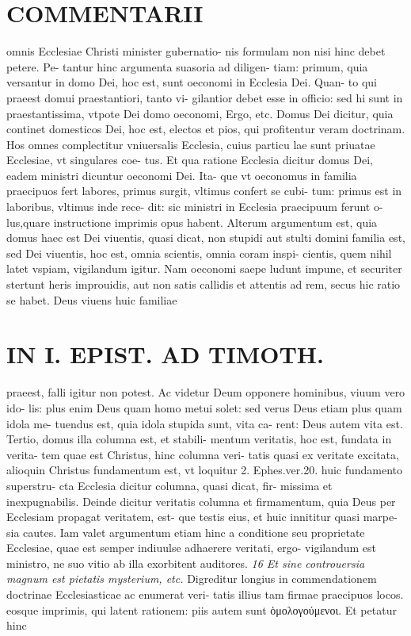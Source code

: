 \documentclass{article}
\begin{document}
\begin{pages}
\section*{COMMENTARII }
\marginpar{[ p.78 ]}\pstart omnis Ecclesiae Christi minister gubernatio- nis formulam non nisi hinc debet petere. Pe- tantur hinc argumenta suasoria ad diligen- tiam: primum, quia versantur in domo Dei, hoc est, sunt oeconomi in Ecclesia Dei. Quan- to qui praeest domui praestantiori, tanto vi- gilantior debet esse in officio: sed hi sunt in praestantissima, vtpote Dei domo oeconomi, Ergo, etc. Domus Dei dicitur, quia continet domesticos Dei, hoc est, electos et pios, qui profitentur veram doctrinam. Hos omnes complectitur vniuersalis Ecclesia, cuius particu lae sunt priuatae Ecclesiae, vt singulares coe- tus. Et qua ratione Ecclesia dicitur domus Dei, eadem ministri dicuntur oeconomi Dei. Ita- que vt oeconomus in familia praecipuos fert labores, primus surgit, vltimus confert se cubi- tum: primus est in laboribus, vltimus inde rece- dit: sic ministri in Ecclesia praecipuum ferunt o- lus,quare instructione imprimis opus habent.  \pend\pstart Alterum argumentum est, quia domus haec est Dei viuentis, quasi dicat, non stupidi aut stulti domini familia est, sed Dei viuentis, hoc est, omnia scientis, omnia coram inspi- cientis, quem nihil latet vspiam, vigilandum igitur. Nam oeconomi saepe ludunt impune, et securiter stertunt heris improuidis, aut non satis callidis et attentis ad rem, secus hic ratio se habet. Deus viuens huic familiae  \pend
\section*{IN I. EPIST. AD TIMOTH. }
\marginpar{[ p.79 ]}\pstart praeest, falli igitur non potest. Ac videtur Deum opponere hominibus, viuum vero ido- lis: plus enim Deus quam homo metui solet: sed verus Deus etiam plus quam idola me- tuendus est, quia idola stupida sunt, vita ca- rent: Deus autem vita est.  \pend\pstart Tertio, domus illa columna est, et stabili- mentum veritatis, hoc est, fundata in verita- tem quae est Christus, hinc columna veri- tatis quasi ex veritate excitata, alioquin Christus fundamentum est, vt loquitur 2. Ephes.ver.20. huic fundamento superstru- cta Ecclesia dicitur columna, quasi dicat, fir- missima et inexpugnabilis. Deinde dicitur veritatis columna et firmamentum, quia Deus per Ecclesiam propagat veritatem, est- que testis eius, et huic innititur quasi marpe- sia cautes. Iam valet argumentum etiam hinc a conditione seu proprietate Ecclesiae, quae est semper indiuulse adhaerere veritati, ergo- vigilandum est ministro, ne suo vitio ab illa exorbitent auditores.  \pend
\textit{16 Et sine controuersia magnum est pietatis mysterium, etc. }\pstart Digreditur longius in commendationem doctrinae Ecclesiasticae ac enumerat veri- tatis illius tam firmae praecipuos locos. eosque imprimis, qui latent rationem: piis autem sunt ὁμολογούμενοι. Et petatur hinc  \pend

\end{pages}
\end{document}
